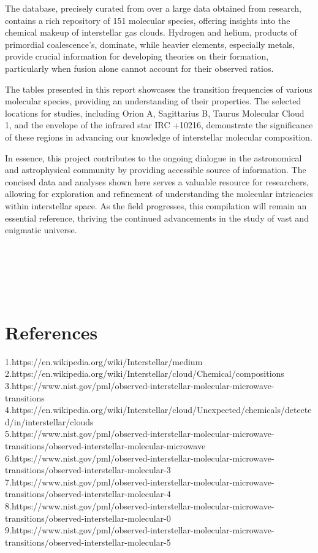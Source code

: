 \documentclass{article}
\begin{document}
The database, precisely curated from over a large data obtained from research, contains a rich repository of 151 molecular species, offering insights into the chemical makeup of interstellar gas clouds. Hydrogen and helium, products of primordial coalescence's, dominate, while heavier elements, especially metals, provide crucial information for developing theories on their formation, particularly when fusion alone cannot account for their observed ratios.

The tables presented in this report showcases the transition frequencies of various molecular species, providing an understanding of their properties. The selected locations for studies, including Orion A, Sagittarius B, Taurus Molecular Cloud 1, and the envelope of the infrared star IRC +10216, demonstrate the significance of these regions in advancing our knowledge of interstellar molecular composition.

In essence, this project contributes to the ongoing dialogue in the astronomical and astrophysical community by providing accessible source of information. The concised data and analyses shown here serves a valuable resource for researchers, allowing for exploration and refinement of understanding the molecular intricacies within interstellar space. As the field progresses, this compilation will remain an essential reference, thriving the continued advancements in the study of vast and enigmatic universe.
\\ \\ \\ \\ \\ \\ 


\section{References}

1.https://en.wikipedia.org/wiki/Interstellar/medium \\
2.https://en.wikipedia.org/wiki/Interstellar/cloud/Chemical/compositions\\
3.https://www.nist.gov/pml/observed-interstellar-molecular-microwave-transitions\\
4.https://en.wikipedia.org/wiki/Interstellar/cloud/Unexpected/chemicals/detected/in/interstellar/clouds    \\  
5.https://www.nist.gov/pml/observed-interstellar-molecular-microwave-transitions/observed-interstellar-molecular-microwave\\
6.https://www.nist.gov/pml/observed-interstellar-molecular-microwave-transitions/observed-interstellar-molecular-3\\
7.https://www.nist.gov/pml/observed-interstellar-molecular-microwave-transitions/observed-interstellar-molecular-4\\
8.https://www.nist.gov/pml/observed-interstellar-molecular-microwave-transitions/observed-interstellar-molecular-0\\
9.https://www.nist.gov/pml/observed-interstellar-molecular-microwave-transitions/observed-interstellar-molecular-5\\ \\ \\
\end{document}
